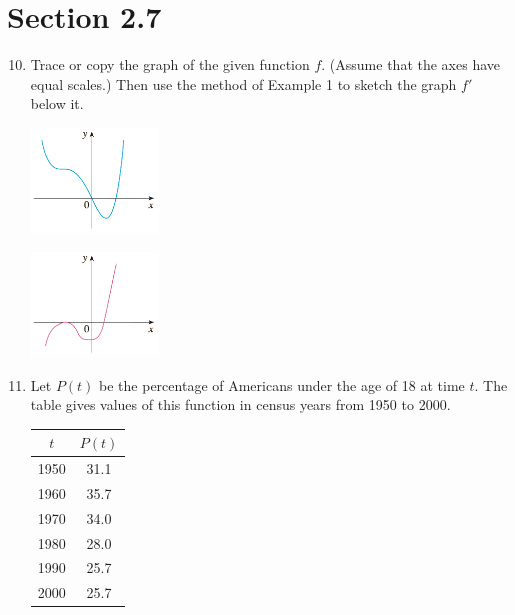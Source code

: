 \documentclass{article}
\begin{document}
\section{Section 2.7}
\begin{enumerate}
\setcounter{enumi}{9}
	\item Trace or copy the graph of the given function $f$. (Assume that the axes have equal scales.) Then use the method of Example 1 to sketch the graph $f'$ below it.
	\begin{center}
	\begin{minipage}[t]{.5\textwidth}
	\begin{center}\includegraphics[width=3.4cm]{images/27pr10}\end{center}
	\end{minipage}%
	\begin{minipage}[t]{.5\textwidth}
	\begin{center}\includegraphics[width=3.4cm]{images/27pr10a}\end{center}
	\end{minipage}
	\end{center}
\setcounter{enumi}{33}
	\item Let $P(t)$ be the percentage of Americans under the age of 18 at time $t$. The table gives values of this function in census years from 1950 to 2000.
	\begin{center}
		\begin{tabular}{c|c}
		$t$    & $P(t)$ \\\hline
		1950 & 31.1 \\
		1960 & 35.7 \\
		1970 & 34.0 \\
		1980 & 28.0 \\
		1990 & 25.7 \\
		2000 & 25.7
		\end{tabular}

\end{center}
\end{enumerate}
\end{document}
